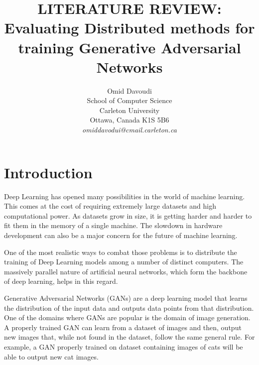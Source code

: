 \documentclass[11pt]{article}       %
\begin{document}


\title{LITERATURE REVIEW: Evaluating Distributed methods for training Generative Adversarial Networks}


\author{
Omid Davoudi\\
School of Computer Science\\
Carleton University\\
Ottawa, Canada K1S 5B6\\
{\em omiddavodui@cmail.carleton.ca}
} %

\maketitle



\section{Introduction} \label{intro}

Deep Learning has opened many possibilities in the world of machine learning. This comes at the cost of requiring extremely large datasets and high computational power. As datasets grow in size, it is getting harder and harder to fit them in the memory of a single machine. The slowdown in hardware development can also be a major concern for the future of machine learning.

One of the most realistic ways to combat those problems is to distribute the training of Deep Learning models among a number of distinct computers. The massively parallel nature of artificial neural networks, which form the backbone of deep learning, helps in this regard.

Generative Adversarial Networks (GANs)\cite{goodfellow2014generative} are a deep learning model that learns the distribution of the input data and outputs data points from that distribution. One of the domains where GANs are popular is the domain of image generation. A properly trained GAN can learn from a dataset of images and then, output new images that, while not found in the dataset, follow the same general rule. For example, a GAN properly trained on dataset containing images of cats will be able to output new cat images.
\end{document}
